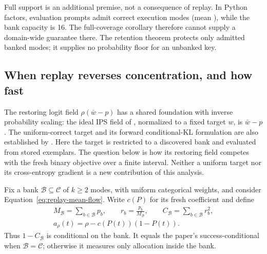 Full support is an additional premise, not a consequence of replay. In
Python factors, evaluation prompts admit \MDvmPythonRange{} correct execution
modes (mean \MDvmPythonMean{}), while the bank capacity is 16. The
full-coverage corollary therefore cannot supply a domain-wide guarantee there. The retention theorem protects only
admitted banked modes; it supplies no probability floor for an unbanked key.

\subsection{When replay reverses concentration, and how fast}
\label{app:theory-replay-finite-horizon}

The restoring logit field $\rho(\bar w-p)$ has a shared foundation with
inverse probability scaling: the ideal IPS field of
\citet[Theorem~4.1]{sinha2026expected}, normalized to a fixed target $w$, is
$\bar w-p$. The uniform-correct target and its forward conditional-KL
formulation are also established by \citet{lochab2026ucpo}. Here the target is
restricted to a discovered bank and evaluated from stored exemplars. The
question below is how its restoring field competes with the fresh binary
objective over a finite interval. Neither a uniform target nor its
cross-entropy gradient is a new contribution of this analysis.

Fix a bank $\mathcal B\subseteq\mathcal C$ of $k\ge2$ modes, with uniform
categorical weights, and consider Equation~\eqref{eq:replay-mean-flow}.
Write $c(P)$ for its fresh coefficient and define
\begin{equation}
 \begin{gathered}
 M_{\mathcal B}=\sum_{b\in\mathcal B}p_b,\qquad
 r_b=\frac{p_b}{M_{\mathcal B}},\qquad
 C_{\mathcal B}=\sum_{b\in\mathcal B}r_b^2,\\
 a_\rho(t)=\rho-c(P(t))(1-P(t)).
 \end{gathered}
 \label{eq:replay-finite-notation}
\end{equation}
Thus $1-C_{\mathcal B}$ is \pmd{} conditional on the bank. It equals the
paper's success-conditional \pmd{} when $\mathcal B=\mathcal C$; otherwise
it measures only allocation inside the bank.

